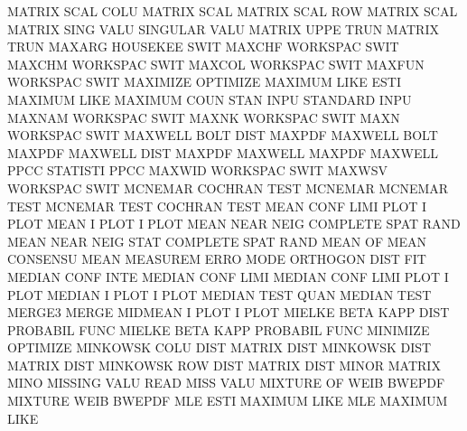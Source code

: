 MATRIX   SCAL COLU                      MATRIX   SCAL
MATRIX   SCAL ROW                       MATRIX   SCAL
MATRIX   SING VALU                      SINGULAR VALU
MATRIX   UPPE TRUN                      MATRIX   TRUN
MAXARG                                  HOUSEKEE SWIT
MAXCHF                                  WORKSPAC SWIT
MAXCHM                                  WORKSPAC SWIT
MAXCOL                                  WORKSPAC SWIT
MAXFUN                                  WORKSPAC SWIT
MAXIMIZE                                OPTIMIZE
MAXIMUM  LIKE ESTI                      MAXIMUM  LIKE
MAXIMUM  COUN STAN INPU                 STANDARD INPU
MAXNAM                                  WORKSPAC SWIT
MAXNK                                   WORKSPAC SWIT
MAXN                                    WORKSPAC SWIT
MAXWELL  BOLT DIST                      MAXPDF
MAXWELL  BOLT                           MAXPDF
MAXWELL  DIST                           MAXPDF
MAXWELL                                 MAXPDF
MAXWELL  PPCC                           STATISTI PPCC
MAXWID                                  WORKSPAC SWIT
MAXWSV                                  WORKSPAC SWIT
MCNEMAR                                 COCHRAN  TEST
MCNEMAR                                 MCNEMAR  TEST
MCNEMAR  TEST                           COCHRAN  TEST
MEAN     CONF LIMI PLOT                 I        PLOT
MEAN     I    PLOT                      I        PLOT
MEAN     NEAR NEIG                      COMPLETE SPAT RAND
MEAN     NEAR NEIG STAT                 COMPLETE SPAT RAND
MEAN     OF   MEAN                      CONSENSU MEAN
MEASUREM ERRO MODE                      ORTHOGON DIST FIT
MEDIAN   CONF INTE                      MEDIAN   CONF LIMI
MEDIAN   CONF LIMI PLOT                 I        PLOT
MEDIAN   I    PLOT                      I        PLOT
MEDIAN   TEST QUAN                      MEDIAN   TEST
MERGE3                                  MERGE
MIDMEAN  I    PLOT                      I        PLOT
MIELKE   BETA KAPP DIST                 PROBABIL FUNC
MIELKE   BETA KAPP                      PROBABIL FUNC
MINIMIZE                                OPTIMIZE
MINKOWSK COLU DIST                      MATRIX   DIST
MINKOWSK DIST                           MATRIX   DIST
MINKOWSK ROW  DIST                      MATRIX   DIST
MINOR                                   MATRIX   MINO
MISSING  VALU                           READ     MISS VALU 
MIXTURE  OF   WEIB                      BWEPDF
MIXTURE  WEIB                           BWEPDF
MLE      ESTI                           MAXIMUM  LIKE
MLE                                     MAXIMUM  LIKE
